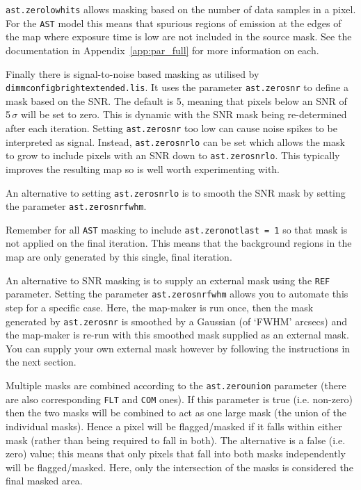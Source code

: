 \documentclass[twoside,11pt]{article}
\newcommand{\htmlref}[2]{#1}
\newcommand{\latexhtml}[2]{#1}
\renewcommand{\_}{\texttt{\symbol{95}}}
\newcommand{\cref}[3]{\latexhtml{#1~\ref{#2}}{\htmlref{#3}{#2}}}
\begin{document}
\texttt{ast.zero\_lowhits} allows masking based on the number of data
samples in a pixel. For the \texttt{AST} model this means that
spurious regions of emission at the edges of the map where exposure
time is low are not included in the source mask. See the documentation
in \cref{Appendix}{app:par_full}{Configuration Parameters:
dimmconfig.lis} for more information on each.

Finally there is signal-to-noise based masking as utilised by
\texttt{dimmconfig\_bright\_extended.lis}. It uses the parameter
\texttt{ast.zero\_snr} to define a mask based on the SNR. The default
is 5, meaning that pixels below an SNR of 5\,$\sigma$ will be set to
zero. This is dynamic with the SNR mask being re-determined after each
iteration. Setting \texttt{ast.zero\_snr} too low can cause noise
spikes to be interpreted as signal. Instead, \texttt{ast.zero\_snrlo}
can be set which allows the mask to grow to include pixels with an SNR
down to \texttt{ast.zero\_snrlo}. This typically improves the
resulting map so is well worth experimenting with. 

An alternative to setting \texttt{ast.zero\_snrlo} is to smooth the
SNR mask by setting the parameter \texttt{ast.zero\_snr\_fwhm}.

Remember for all \texttt{AST} masking to include
\texttt{ast.zero\_notlast = 1} so that mask is not applied on the
final iteration. This means that the background regions in the map are
only generated by this single, final iteration.

An alternative to SNR masking is to supply an external mask using the
\texttt{REF} parameter.  Setting the parameter
\texttt{ast.zero\_snr\_fwhm} allows you to automate this step for a
specific case. Here, the map-maker is run once, then the mask
generated by \texttt{ast.zero\_snr} is smoothed by a Gaussian (of
`FWHM' arcsecs) and the map-maker is re-run with this smoothed mask
supplied as an external mask. You can supply your own external mask
however by following the instructions in the next section.

Multiple masks are combined according to the \texttt{ast.zero\_union}
parameter (there are also corresponding \texttt{FLT} and \texttt{COM}
ones). If this parameter is true (i.e. non-zero) then the two masks
will be combined to act as one large mask (the union of the individual
masks). Hence a pixel will be flagged/masked if it falls within either
mask (rather than being required to fall in both). The alternative is
a false (i.e. zero) value; this means that only pixels that fall into
both masks independently will be flagged/masked. Here, only the
intersection of the masks is considered the final masked area.
\end{document}
